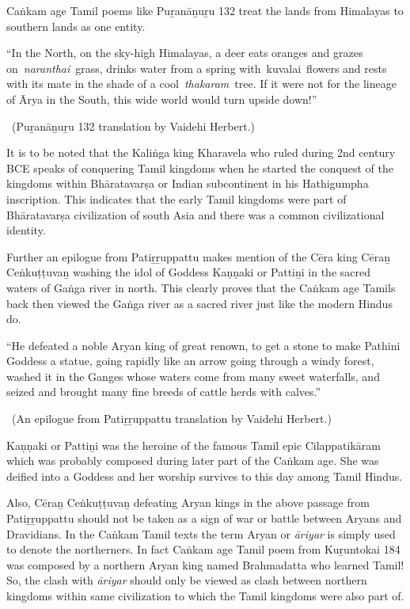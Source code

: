 Caṅkam age Tamil poems like Puṟanāṉuṟu 132 treat the lands from Himalayas to southern lands as one entity.

\begin{myquote}
“In the North, on the sky-high Himalayas, a deer eats oranges and grazes on \textit{naranthai} grass, drinks water from a spring with kuvalai flowers and rests with its mate in the shade of a cool \textit{thakaram} tree. If it were not for the lineage of Ārya in the South, this wide world would turn upside down!”

~\hfill (Puṟanāṉuṟu 132 translation by Vaidehi Herbert.)
\end{myquote}

It is to be noted that the Kaliṅga king Kharavela who ruled during 2nd century BCE speaks of conquering Tamil kingdoms when he started the conquest of the kingdoms within Bhāratavarṣa or Indian subcontinent in his Hathigumpha inscription. This indicates that the early Tamil kingdoms were part of Bhāratavarṣa civilization of south Asia and there was a common civilizational identity.

Further an epilogue from Patiṟṟuppattu makes mention of the Cēra king Cēraṉ Ceṅkuṭṭuvaṉ washing the idol of Goddess Kaṇṇaki or Pattiṉi in the sacred waters of Gaṅga river in north. This clearly proves that the Caṅkam age Tamils back then viewed the Gaṅga river as a sacred river just like the modern Hindus do.

\begin{myquote}
“He defeated a noble Aryan king of great renown, to get a stone to make Pathini Goddess a statue, going rapidly like an arrow going through a windy forest, washed it in the Ganges whose waters come from many sweet waterfalls, and seized and brought many fine breeds of cattle herds with calves.”

~\hfill (An epilogue from Patiṟṟuppattu translation by Vaidehi Herbert.)
\end{myquote}

Kaṇṇaki or Pattiṉi was the heroine of the famous Tamil epic Cilappatikāram which was probably composed during later part of the Caṅkam age. She was deified into a Goddess and her worship survives to this day among Tamil Hindus.

Also, Cēraṉ Ceṅkuṭṭuvaṉ defeating Aryan kings in the above passage from Patiṟṟuppattu should not be taken as a sign of war or battle between Aryans and Dravidians. In the Caṅkam Tamil texts the term Aryan or \textit{āriyar} is simply used to denote the northerners. In fact Caṅkam age Tamil poem from Kuṟuntokai 184 was composed by a northern Aryan king named Brahmadatta who learned Tamil! So, the clash with \textit{āriyar} should only be viewed as clash between northern kingdoms within same civilization to which the Tamil kingdoms were also part of.

